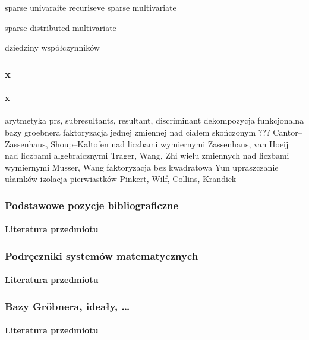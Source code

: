 \documentclass{beamer}
\begin{document}
        sparse univaraite
        recuriseve sparse multivariate

        sparse distributed multivariate

    dziedziny współczynników


\begin{frame}
    \frametitle{x}
    \framesubtitle{x}

    arytmetyka
    prs, subresultants, resultant, discriminant
    dekompozycja funkcjonalna
    bazy groebnera
    faktoryzacja
        jednej zmiennej
            nad ciałem skończonym
                ???
                Cantor--Zassenhaus, Shoup--Kaltofen
            nad liczbami wymiernymi
                Zassenhaus, van Hoeij
            nad liczbami algebraicznymi
                Trager, Wang, Zhi
        wielu zmiennych
            nad liczbami wymiernymi
                Musser, Wang
    faktoryzacja bez kwadratowa
        Yun
    upraszczanie ułamków
    izolacja pierwiastków
        Pinkert, Wilf,
        Collins, Krandick

\end{frame}

\begin{frame}[allowframebreaks]
    \frametitle{Podstawowe pozycje bibliograficzne}
    \framesubtitle{Literatura przedmiotu}


\end{frame}

\begin{frame}[allowframebreaks]
    \frametitle{Podręczniki systemów matematycznych}
    \framesubtitle{Literatura przedmiotu}


\end{frame}

\begin{frame}[allowframebreaks]
    \frametitle{Bazy Gr\"{o}bnera, ideały, \ldots}
    \framesubtitle{Literatura przedmiotu}



\end{frame}
\end{document}
